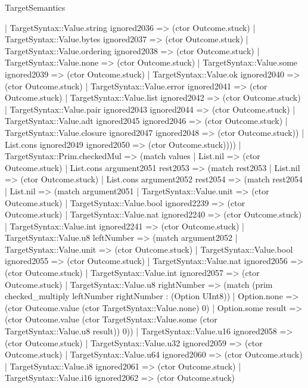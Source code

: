 \begin{lexlean}{TargetSemantics}
\begin{semanticmodule}
{            | TargetSyntax::Value.string ignored2036 => (ctor Outcome.stuck)
            | TargetSyntax::Value.bytes ignored2037 => (ctor Outcome.stuck)
            | TargetSyntax::Value.ordering ignored2038 => (ctor Outcome.stuck)
            | TargetSyntax::Value.none => (ctor Outcome.stuck)
            | TargetSyntax::Value.some ignored2039 => (ctor Outcome.stuck)
            | TargetSyntax::Value.ok ignored2040 => (ctor Outcome.stuck)
            | TargetSyntax::Value.error ignored2041 => (ctor Outcome.stuck)
            | TargetSyntax::Value.list ignored2042 => (ctor Outcome.stuck)
            | TargetSyntax::Value.pair ignored2043 ignored2044 => (ctor Outcome.stuck)
            | TargetSyntax::Value.adt ignored2045 ignored2046 => (ctor Outcome.stuck)
            | TargetSyntax::Value.closure ignored2047 ignored2048 => (ctor Outcome.stuck))
          | List.cons ignored2049 ignored2050 => (ctor Outcome.stuck))))
    | TargetSyntax::Prim.checkedMul => (match values
      | List.nil => (ctor Outcome.stuck)
      | List.cons argument2051 rest2053 => (match rest2053
        | List.nil => (ctor Outcome.stuck)
        | List.cons argument2052 rest2054 => (match rest2054
          | List.nil => (match argument2051
            | TargetSyntax::Value.unit => (ctor Outcome.stuck)
            | TargetSyntax::Value.bool ignored2239 => (ctor Outcome.stuck)
            | TargetSyntax::Value.nat ignored2240 => (ctor Outcome.stuck)
            | TargetSyntax::Value.int ignored2241 => (ctor Outcome.stuck)
            | TargetSyntax::Value.u8 leftNumber => (match argument2052
              | TargetSyntax::Value.unit => (ctor Outcome.stuck)
              | TargetSyntax::Value.bool ignored2055 => (ctor Outcome.stuck)
              | TargetSyntax::Value.nat ignored2056 => (ctor Outcome.stuck)
              | TargetSyntax::Value.int ignored2057 => (ctor Outcome.stuck)
              | TargetSyntax::Value.u8 rightNumber => (match (prim checked_multiply leftNumber rightNumber : (Option UInt8))
                | Option.none => (ctor Outcome.value (ctor TargetSyntax::Value.none) 0)
                | Option.some result => (ctor Outcome.value (ctor TargetSyntax::Value.some (ctor TargetSyntax::Value.u8 result)) 0))
              | TargetSyntax::Value.u16 ignored2058 => (ctor Outcome.stuck)
              | TargetSyntax::Value.u32 ignored2059 => (ctor Outcome.stuck)
              | TargetSyntax::Value.u64 ignored2060 => (ctor Outcome.stuck)
              | TargetSyntax::Value.i8 ignored2061 => (ctor Outcome.stuck)
              | TargetSyntax::Value.i16 ignored2062 => (ctor Outcome.stuck)
}
\end{semanticmodule}
\end{lexlean}
